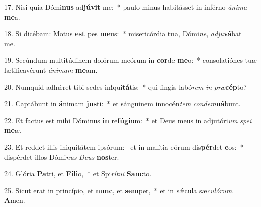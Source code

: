 17. Nisi quia Dómi\textbf{nus} ad\textbf{jú}\textbf{vit} me:~*  paulo minus habitásset in inférno \textit{á}\textit{ni}\textit{ma} \textbf{me}a.\

18. Si dicébam: Motus \textbf{est} pes \textbf{me}us:~*  misericórdia tua, Dómi\textit{ne}, \textit{ad}\textit{ju}\textbf{vá}bat me.\

19. Secúndum multitúdinem dolórum meórum in \textbf{cor}de \textbf{me}o:~*  consolatiónes tuæ lætificavérunt \textit{á}\textit{ni}\textit{mam} \textbf{me}am.\

20. Numquid adhǽret tibi sedes in\textbf{i}qui\textbf{tá}tis:~*  qui fingis labó\textit{rem} \textit{in} \textit{præ}\textbf{cép}to?\

21. Captábunt in \textbf{á}nimam \textbf{jus}ti:~*  et sánguinem innocén\textit{tem} \textit{con}\textit{dem}\textbf{ná}bunt.\

22. Et factus est mihi Dóminus \textbf{in} re\textbf{fú}\textbf{gi}um:~*  et Deus meus in adjutóri\textit{um} \textit{spe}\textit{i} \textbf{me}æ.\

23. Et reddet illis iniquitátem ipsórum: \dag\  et in malítia eórum dis\textbf{pér}det \textbf{e}os:~*  dispérdet illos Dómi\textit{nus} \textit{De}\textit{us} \textbf{nos}ter.\

24. Glória \textbf{Pa}tri, et \textbf{Fí}\textbf{li}o,~*  et Spi\textit{rí}\textit{tu}\textit{i} \textbf{Sanc}to.\

25. Sicut erat in princípio, et \textbf{nunc}, et \textbf{sem}per,~*  et in sǽcula sæ\textit{cu}\textit{ló}\textit{rum}. \textbf{A}men.\

